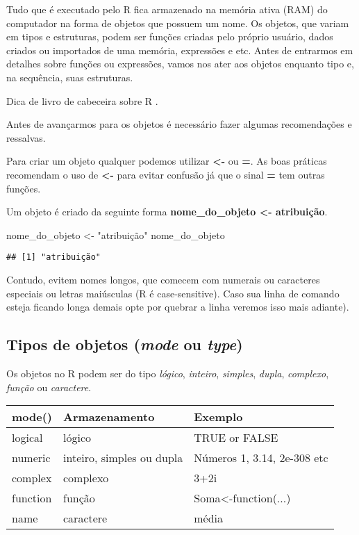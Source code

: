 \documentclass[
]{book}
\newenvironment{Shaded}{\begin{snugshade}}{\end{snugshade}}
\newcommand{\NormalTok}[1]{#1}
\newcommand{\OtherTok}[1]{\textcolor[rgb]{0.56,0.35,0.01}{#1}}
\newcommand{\StringTok}[1]{\textcolor[rgb]{0.31,0.60,0.02}{#1}}
\begin{document}
Tudo que é executado pelo R fica armazenado na memória ativa (RAM) do computador na forma de objetos que possuem um nome. Os objetos, que variam em tipos e estruturas, podem ser funções criadas pelo próprio usuário, dados criados ou importados de uma memória, expressões e etc. Antes de entrarmos em detalhes sobre funções ou expressões, vamos nos ater aos objetos enquanto tipo e, na sequência, suas estruturas.

Dica de livro de cabeceira sobre R \citet{melloandpeternelli2013}.

Antes de avançarmos para os objetos é necessário fazer algumas recomendações e ressalvas.

Para criar um objeto qualquer podemos utilizar \textbf{\textless-} ou \textbf{=}. As boas práticas recomendam o uso de \textbf{\textless-} para evitar confusão já que o sinal \textbf{=} tem outras funções.

Um objeto é criado da seguinte forma \textbf{nome\_do\_objeto \textless- atribuição}.

\begin{Shaded}
\begin{Highlighting}[]
\NormalTok{nome\_do\_objeto }\OtherTok{\textless{}{-}} \StringTok{"atribuição"}
\NormalTok{nome\_do\_objeto}
\end{Highlighting}
\end{Shaded}

\begin{verbatim}
## [1] "atribuição"
\end{verbatim}

Contudo, evitem nomes longos, que comecem com numerais ou caracteres especiais ou letras maiúsculas (R é case-sensitive).
Caso sua linha de comando esteja ficando longa demais opte por quebrar a linha veremos isso mais adiante).

\hypertarget{tipos-de-objetos-mode-ou-type}{%
\subsection{\texorpdfstring{Tipos de objetos (\emph{mode} ou \emph{type})}{Tipos de objetos (mode ou type)}}\label{tipos-de-objetos-mode-ou-type}}

Os objetos no R podem ser do tipo \emph{lógico}, \emph{inteiro}, \emph{simples}, \emph{dupla}, \emph{complexo}, \emph{função} ou \emph{caractere}.

\begin{tabular}{l|l|l}
\hline
mode() & Armazenamento & Exemplo\\
\hline
logical & lógico & TRUE or FALSE\\
\hline
numeric & inteiro, simples ou dupla & Números 1, 3.14, 2e-308 etc\\
\hline
complex & complexo & 3+2i\\
\hline
function & função & Soma<-function(...)\\
\hline
name & caractere & média\\
\hline
\end{tabular}
\end{document}
